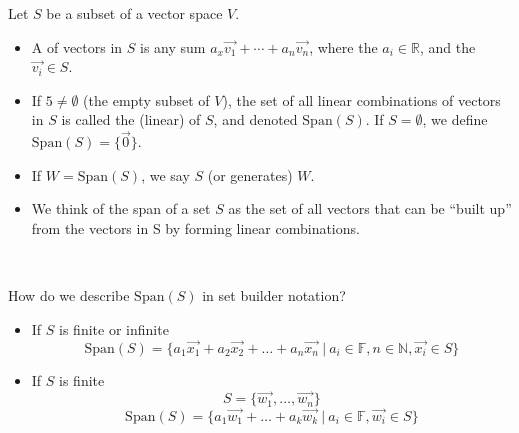 \documentclass[11pt,fleqn]{book} %
\begin{document}
\setcounter{section}{3}
\setcounter{definitionT}{0}
\begin{definition}
    Let $S$ be a subset of a vector space $V$.
    
    \begin{itemize}
        \item A  of vectors in $S$ is any sum $a_x\overrightarrow{v_1} + \cdots + a_n\overrightarrow{v_n}$, where the $a_i \in \mathbb{R}$, and the $\overrightarrow{v_i} \in S$.

        \item If $5 \neq \emptyset$ (the empty subset of $V$), the set of all linear combinations of vectors in $S$ is called the (linear)  of $S$, and denoted $\mathrm{Span}(S)$. If $S = \emptyset$, we define $\mathrm{Span}(S) = \{ \overrightarrow{0} \}$.

        \item If $W = \mathrm{Span}(S)$, we say $S$  (or generates) $W$.

        \item We think of the span of a set $S$ as the set of all vectors that can be ``built up'' from the vectors in S by forming linear combinations.
    \end{itemize}
\end{definition}
\setcounter{section}{4}

{~~~}

How do we describe $\mathrm{Span}(S)$ in set builder notation? 
\begin{itemize}
  \item If $S$ is finite or infinite 
  $$\mathrm{Span}\left( S \right) = \{ a_1\overrightarrow{x_1} + a_2\overrightarrow{x_2} + \dots + a_n\overrightarrow{x_n} ~|~ a_i \in \mathbb{F}, n \in \mathbb{N},  \overrightarrow{x_i} \in S \}$$

  \item If $S$ is finite 
  $$S = \{ \overrightarrow{w_1} , \dots, \overrightarrow{w_n} \}$$ 
  $$\mathrm{Span}\left( S \right) = \{ a_1\overrightarrow{w_1} + \dots + a_k\overrightarrow{w_k} ~|~ a_i \in \mathbb{F}, \overrightarrow{w_i} \in S \}$$
\end{itemize}
\end{document}

